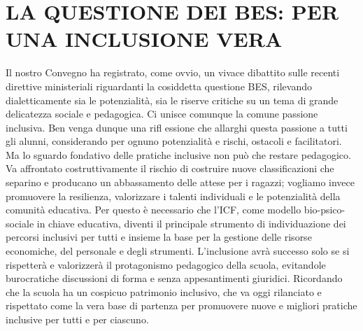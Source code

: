 \section*{LA QUESTIONE DEI BES: PER UNA INCLUSIONE VERA}
Il nostro Convegno ha registrato, come ovvio, un vivace dibattito sulle recenti direttive
ministeriali riguardanti la cosiddetta questione BES, rilevando dialetticamente sia le potenzialità, sia le riserve critiche su un tema di grande delicatezza sociale e pedagogica.
Ci unisce comunque la comune passione inclusiva. Ben venga dunque una rifl essione
che allarghi questa passione a tutti gli alunni, considerando per ognuno potenzialità e
rischi, ostacoli e facilitatori. Ma lo sguardo fondativo delle pratiche inclusive non può
che restare pedagogico. Va affrontato costruttivamente il rischio di costruire nuove
classificazioni che separino e producano un abbassamento delle attese per i ragazzi;
vogliamo invece promuovere la resilienza, valorizzare i talenti individuali e le potenzialità
della comunità educativa. Per questo è necessario che l'ICF, come modello bio-psico-
sociale in chiave educativa, diventi il principale strumento di individuazione dei percorsi
inclusivi per tutti e insieme la base per la gestione delle risorse economiche, del personale e degli strumenti. L'inclusione avrà successo solo se si rispetterà e valorizzerà
il protagonismo pedagogico della scuola, evitandole burocratiche discussioni di forma
e senza appesantimenti giuridici. Ricordando che la scuola ha un cospicuo patrimonio
inclusivo, che va oggi rilanciato e rispettato come la vera base di partenza per promuovere nuove e migliori pratiche inclusive per tutti e per ciascuno.
